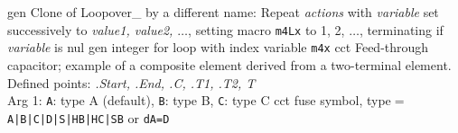 %
  {gen}%
  {Clone of Loopover\_ by a different name:
   Repeat {\sl actions} with {\sl variable} set successively to
   {\sl value1, value2, $\ldots$}, setting macro {\tt m4Lx} to 1, 2,
   $\ldots$, terminating if {\sl variable} is nul}%
%
  {gen}%
  {integer for loop with index variable {\tt m4x} }%
%
  {cct}%
  {Feed-through capacitor; example of a composite element derived from
   a two-terminal element.  Defined points:
   {\sl .Start, .End, .C, .T1, .T2, T}\\
   Arg 1: {\tt A}:  type A (default),
   {\tt B}: type B,
   {\tt C}: type C 
   }%
%
  {cct}%
  {fuse symbol, type$=$
  {\tt  A|B|C|D|S|HB|HC|SB} or {\tt dA=D}}%

%

